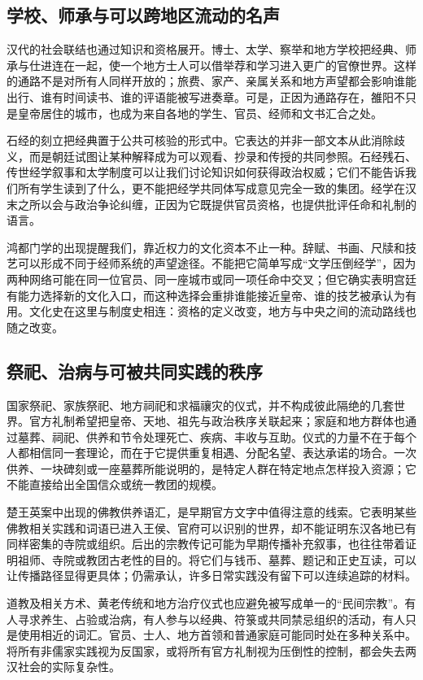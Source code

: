 \subsection{学校、师承与可以跨地区流动的名声}

汉代的社会联结也通过知识和资格展开。博士、太学、察举和地方学校把经典、师承与仕进连在一起，使一个地方士人可以借举荐和学习进入更广的官僚世界。这样的通路不是对所有人同样开放的；旅费、家产、亲属关系和地方声望都会影响谁能出行、谁有时间读书、谁的评语能被写进奏章。可是，正因为通路存在，雒阳不只是皇帝居住的城市，也成为来自各地的学生、官员、经师和文书汇合之处。

石经的刻立把经典置于公共可核验的形式中。它表达的并非一部文本从此消除歧义，而是朝廷试图让某种解释成为可以观看、抄录和传授的共同参照。石经残石、传世经学叙事和太学制度可以让我们讨论知识如何获得政治权威；它们不能告诉我们所有学生读到了什么，更不能把经学共同体写成意见完全一致的集团。经学在汉末之所以会与政治争论纠缠，正因为它既提供官员资格，也提供批评任命和礼制的语言。

鸿都门学的出现提醒我们，靠近权力的文化资本不止一种。辞赋、书画、尺牍和技艺可以形成不同于经师系统的声望途径。不能把它简单写成“文学压倒经学”，因为两种网络可能在同一位官员、同一座城市或同一项任命中交叉；但它确实表明宫廷有能力选择新的文化入口，而这种选择会重排谁能接近皇帝、谁的技艺被承认为有用。文化史在这里与制度史相连：资格的定义改变，地方与中央之间的流动路线也随之改变。

\subsection{祭祀、治病与可被共同实践的秩序}

国家祭祀、家族祭祀、地方祠祀和求福禳灾的仪式，并不构成彼此隔绝的几套世界。官方礼制希望把皇帝、天地、祖先与政治秩序关联起来；家庭和地方群体也通过墓葬、祠祀、供养和节令处理死亡、疾病、丰收与互助。仪式的力量不在于每个人都相信同一套理论，而在于它提供重复相遇、分配名望、表达承诺的场合。一次供养、一块碑刻或一座墓葬所能说明的，是特定人群在特定地点怎样投入资源；它不能直接给出全国信众或统一教团的规模。

楚王英案中出现的佛教供养语汇，是早期官方文字中值得注意的线索。它表明某些佛教相关实践和词语已进入王侯、官府可以识别的世界，却不能证明东汉各地已有同样密集的寺院或组织。后出的宗教传记可能为早期传播补充叙事，也往往带着证明祖师、寺院或教团古老性的目的。将它们与钱币、墓葬、题记和正史互读，可以让传播路径显得更具体；仍需承认，许多日常实践没有留下可以连续追踪的材料。

道教及相关方术、黄老传统和地方治疗仪式也应避免被写成单一的“民间宗教”。有人寻求养生、占验或治病，有人参与以经典、符箓或共同禁忌组织的活动，有人只是使用相近的词汇。官员、士人、地方首领和普通家庭可能同时处在多种关系中。将所有非儒家实践视为反国家，或将所有官方礼制视为压倒性的控制，都会失去两汉社会的实际复杂性。

